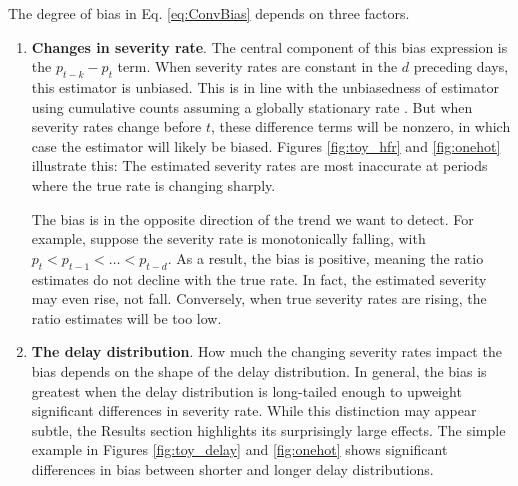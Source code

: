 \documentclass{article}
\newcommand{\ahcomment}[1]{{\color{red}[AH: #1]}}
\begin{document}
The degree of bias in Eq. \ref{eq:ConvBias} depends on three factors.
\begin{enumerate}
    \item \textbf{Changes in severity rate}. The central component of this bias expression is the $p_{t-k}-p_t$ term. When severity rates are constant in the $d$ preceding days, this estimator is unbiased. This is in line with the unbiasedness of estimator using cumulative counts assuming a globally stationary rate \citep{nishiura}. But when severity rates change before $t$, these difference terms will be nonzero, in which case the estimator will likely be biased. 
Figures \ref{fig:toy_hfr} and \ref{fig:onehot} illustrate this: The estimated severity rates are most inaccurate at periods where the true rate is changing sharply. 

The bias is in the opposite direction of the trend we want to detect. For example, suppose the severity rate is monotonically falling, with $p_{t} < p_{t-1} < \ldots < p_{t-d}$.%
As a result, the bias is positive, meaning the ratio estimates do not decline with the true rate. In fact, the estimated severity may even rise, not fall. Conversely, when true severity rates are rising, the ratio estimates will be too low. %

    \item \textbf{The delay distribution}. How much the changing severity rates impact the bias depends on the shape of the delay distribution. In general, the bias is greatest when the delay distribution is long-tailed enough to upweight significant differences in severity rate. While this distinction may appear subtle, the Results section highlights its surprisingly large effects. The simple example in Figures \ref{fig:toy_delay} and \ref{fig:onehot} shows significant differences in bias between shorter and longer delay distributions. 



\end{enumerate}
\end{document}
